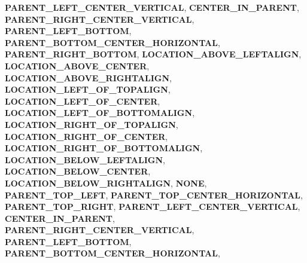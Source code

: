 \begin{DoxyCompactItemize}
{\bfseries P\+A\+R\+E\+N\+T\+\_\+\+L\+E\+F\+T\+\_\+\+C\+E\+N\+T\+E\+R\+\_\+\+V\+E\+R\+T\+I\+C\+AL}, 
{\bfseries C\+E\+N\+T\+E\+R\+\_\+\+I\+N\+\_\+\+P\+A\+R\+E\+NT}, 
{\bfseries P\+A\+R\+E\+N\+T\+\_\+\+R\+I\+G\+H\+T\+\_\+\+C\+E\+N\+T\+E\+R\+\_\+\+V\+E\+R\+T\+I\+C\+AL}, 
{\bfseries P\+A\+R\+E\+N\+T\+\_\+\+L\+E\+F\+T\+\_\+\+B\+O\+T\+T\+OM}, 
\newline
{\bfseries P\+A\+R\+E\+N\+T\+\_\+\+B\+O\+T\+T\+O\+M\+\_\+\+C\+E\+N\+T\+E\+R\+\_\+\+H\+O\+R\+I\+Z\+O\+N\+T\+AL}, 
{\bfseries P\+A\+R\+E\+N\+T\+\_\+\+R\+I\+G\+H\+T\+\_\+\+B\+O\+T\+T\+OM}, 
{\bfseries L\+O\+C\+A\+T\+I\+O\+N\+\_\+\+A\+B\+O\+V\+E\+\_\+\+L\+E\+F\+T\+A\+L\+I\+GN}, 
{\bfseries L\+O\+C\+A\+T\+I\+O\+N\+\_\+\+A\+B\+O\+V\+E\+\_\+\+C\+E\+N\+T\+ER}, 
\newline
{\bfseries L\+O\+C\+A\+T\+I\+O\+N\+\_\+\+A\+B\+O\+V\+E\+\_\+\+R\+I\+G\+H\+T\+A\+L\+I\+GN}, 
{\bfseries L\+O\+C\+A\+T\+I\+O\+N\+\_\+\+L\+E\+F\+T\+\_\+\+O\+F\+\_\+\+T\+O\+P\+A\+L\+I\+GN}, 
{\bfseries L\+O\+C\+A\+T\+I\+O\+N\+\_\+\+L\+E\+F\+T\+\_\+\+O\+F\+\_\+\+C\+E\+N\+T\+ER}, 
{\bfseries L\+O\+C\+A\+T\+I\+O\+N\+\_\+\+L\+E\+F\+T\+\_\+\+O\+F\+\_\+\+B\+O\+T\+T\+O\+M\+A\+L\+I\+GN}, 
\newline
{\bfseries L\+O\+C\+A\+T\+I\+O\+N\+\_\+\+R\+I\+G\+H\+T\+\_\+\+O\+F\+\_\+\+T\+O\+P\+A\+L\+I\+GN}, 
{\bfseries L\+O\+C\+A\+T\+I\+O\+N\+\_\+\+R\+I\+G\+H\+T\+\_\+\+O\+F\+\_\+\+C\+E\+N\+T\+ER}, 
{\bfseries L\+O\+C\+A\+T\+I\+O\+N\+\_\+\+R\+I\+G\+H\+T\+\_\+\+O\+F\+\_\+\+B\+O\+T\+T\+O\+M\+A\+L\+I\+GN}, 
{\bfseries L\+O\+C\+A\+T\+I\+O\+N\+\_\+\+B\+E\+L\+O\+W\+\_\+\+L\+E\+F\+T\+A\+L\+I\+GN}, 
\newline
{\bfseries L\+O\+C\+A\+T\+I\+O\+N\+\_\+\+B\+E\+L\+O\+W\+\_\+\+C\+E\+N\+T\+ER}, 
{\bfseries L\+O\+C\+A\+T\+I\+O\+N\+\_\+\+B\+E\+L\+O\+W\+\_\+\+R\+I\+G\+H\+T\+A\+L\+I\+GN}, 
{\bfseries N\+O\+NE}, 
{\bfseries P\+A\+R\+E\+N\+T\+\_\+\+T\+O\+P\+\_\+\+L\+E\+FT}, 
\newline
{\bfseries P\+A\+R\+E\+N\+T\+\_\+\+T\+O\+P\+\_\+\+C\+E\+N\+T\+E\+R\+\_\+\+H\+O\+R\+I\+Z\+O\+N\+T\+AL}, 
{\bfseries P\+A\+R\+E\+N\+T\+\_\+\+T\+O\+P\+\_\+\+R\+I\+G\+HT}, 
{\bfseries P\+A\+R\+E\+N\+T\+\_\+\+L\+E\+F\+T\+\_\+\+C\+E\+N\+T\+E\+R\+\_\+\+V\+E\+R\+T\+I\+C\+AL}, 
{\bfseries C\+E\+N\+T\+E\+R\+\_\+\+I\+N\+\_\+\+P\+A\+R\+E\+NT}, 
\newline
{\bfseries P\+A\+R\+E\+N\+T\+\_\+\+R\+I\+G\+H\+T\+\_\+\+C\+E\+N\+T\+E\+R\+\_\+\+V\+E\+R\+T\+I\+C\+AL}, 
{\bfseries P\+A\+R\+E\+N\+T\+\_\+\+L\+E\+F\+T\+\_\+\+B\+O\+T\+T\+OM}, 
{\bfseries P\+A\+R\+E\+N\+T\+\_\+\+B\+O\+T\+T\+O\+M\+\_\+\+C\+E\+N\+T\+E\+R\+\_\+\+H\+O\+R\+I\+Z\+O\+N\+T\+AL}, 

\end{DoxyCompactItemize}
